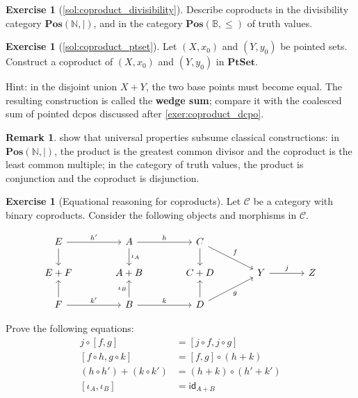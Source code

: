 \documentclass[a4paper,11pt, oneside,titlepage=false]{scrbook}
\theoremstyle{plain}
\theoremstyle{definition}
\newtheorem{rem}[thm]{Remark}
\newtheorem{exer}[thm]{Exercise}
\newcommand{\cfont}[1]{\ensuremath{\mathsf{#1}}}
\newcommand{\Cat}[1]{\mathcal{#1}}
\newcommand{\CC}{\Cat{C}}
\newcommand{\Catb}[1]{\mathbf{#1}}
\newcommand{\PTSET}{\Catb{PtSet}}
\newcommand{\POS}{\Catb{Pos}}
\newcommand{\Id}[1][]{\cfont{id}_{#1}}
\newcommand{\outofcoproduct}[2]{\ensuremath{[ #1, #2 ]}}
\newcommand{\coproductmap}[2]{\ensuremath{ #1 + #2 }}
\newcommand{\co}[2]{\ensuremath{#2 \circ #1}}
\newcommand{\NN}{\ensuremath{\mathbb{N}}}
\begin{document}
\begin{exer}[\cref{sol:coproduct_divisibility}]\label{exer:coproduct_divisibility}
  Describe coproducts in the divisibility category $\POS(\NN, \mid)$, and in
  the category $\POS(\mathbb{B}, \leq)$ of truth values.
\end{exer}

\begin{exer}[\cref{sol:coproduct_ptset}]\label{exer:coproduct_ptset}
  Let $(X, x_0)$ and $(Y, y_0)$ be pointed sets.
  Construct a coproduct of $(X,x_0)$ and $(Y,y_0)$ in $\PTSET$.

  Hint: in the disjoint union $X + Y$, the two base points must become equal.
  The resulting construction is called the \textbf{wedge sum};
  compare it with the coalesced sum of pointed dcpos discussed after
  \cref{exer:coproduct_dcpo}.
\end{exer}

\begin{rem}
   show that
  universal properties subsume classical constructions:
  in $\POS(\NN,\mid)$, the product is the greatest common divisor and the
  coproduct is the least common multiple;
  in the category of truth values, the product is conjunction and the
  coproduct is disjunction.
\end{rem}


\begin{exer}[Equational reasoning for coproducts]
  Let $\CC$ be a category with binary coproducts.
  Consider the following objects and morphisms in $\CC$.

  \[
    \begin{tikzcd}[column sep=large]
      E \ar[r, "h'"] \ar[d]
      &
      A \ar[r, "h"] \ar[d, "\iota_A"]
      &
      C  \ar[d] \ar[rd, "f"]
      \\
      E + F
      &
      A+ B
      &
      C + D
      &
      Y \ar[r, "j"]
      &
      Z
      \\
      F \ar[r, "k'"] \ar[u]
      &
      B \ar[u, "\iota_B"] \ar[r,"k"]
      &
      D \ar[u] \ar[ru, "g"']
    \end{tikzcd}
  \]

  Prove the following equations:
  \begin{align}
    \co{\outofcoproduct{f}{g}}{j} &= \outofcoproduct{\co f j}{\co g j}
    \\
    \outofcoproduct{\co h f}{\co k g} &= \co {(\coproductmap h k)} {\outofcoproduct f g}
    \\
    \coproductmap{(\co {h'} h)}{(\co {k'} k)} &= \co {(\coproductmap {h'} {k'}) }{(\coproductmap h k)}
    \\
    \outofcoproduct{\iota_A}{\iota_B} &= \Id[A + B]
  \end{align}
\end{exer}
\end{document}
